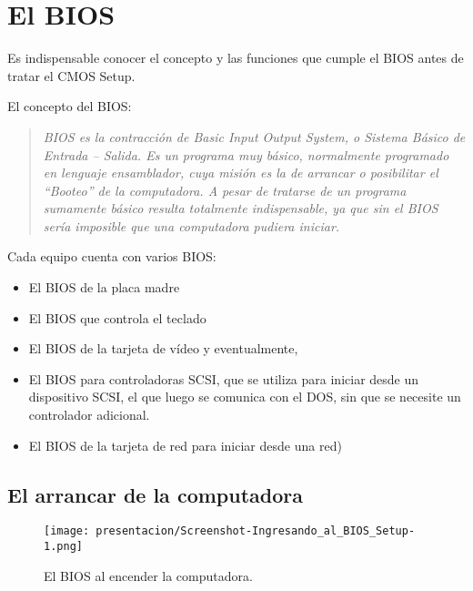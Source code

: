 \documentclass[12pt,oneside,a4paper]{article}
\begin{document}
		\newpage

\section{El BIOS}{\label{sec:bios}}

Es indispensable conocer el concepto y las funciones que cumple el BIOS antes de tratar el CMOS Setup.

El concepto del BIOS:
\begin{quotation}

	{\em BIOS es la contracción de Basic Input Output System, o Sistema Básico de
	Entrada – Salida. 
	Es un programa muy básico, normalmente programado en lenguaje ensamblador,
	cuya misión es la de arrancar o posibilitar el “Booteo” de la computadora.
	A pesar de tratarse de un programa sumamente básico resulta totalmente
	indispensable, ya que sin el BIOS sería imposible que una computadora pudiera
	iniciar.}

\end{quotation}

Cada equipo cuenta con varios BIOS: 
\begin{itemize}
	\item El BIOS de la placa madre 
	\item El BIOS que controla el teclado 
	\item El BIOS de la tarjeta de vídeo y eventualmente, 
	\item El BIOS para controladoras SCSI, que se utiliza para iniciar
		desde un dispositivo SCSI, el que luego se comunica con el DOS, sin
		que se necesite un controlador adicional. 
	\item El BIOS de la tarjeta de red para iniciar desde una red) 
\end{itemize}

	\subsection{El arrancar de la computadora}{\label{sec:bios/arranque}}

	\begin{figure}
		\centering
			\texttt{[image: presentacion/Screenshot-Ingresando\_al\_BIOS\_Setup-1.png]}
		\caption{El BIOS al encender la computadora.}
	\end{figure}
\end{document}
